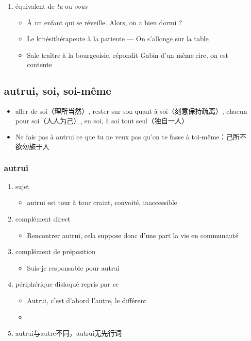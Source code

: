\documentclass[UTF8]{report}
\begin{document}
\begin{enumerate}
\begin{enumerate}
\begin{enumerate}
    \end{enumerate}
    \item équivalent de \textit{tu} ou \textit{vous}
    \begin{itemize}
        \item À un enfant qui se réveille. Alors, on a bien dormi ?
        \item Le kinésithérapeute à la patiente — On s’allonge sur la table
        \item Sale traître à la bourgeoisie, répondit Gabin d’un même rire, on est contente
    \end{itemize}
\end{enumerate}
\end{enumerate}

\subsection{autrui, soi, soi-même}
\begin{itemize}
    \item aller de soi（理所当然）, rester sur son quant-à-soi（刻意保持疏离）, chacun pour soi（人人为己）, en soi, à soi tout seul（独自一人）
    \item Ne fais pas à autrui ce que tu ne veux pas qu’on te fasse à toi-même：己所不欲勿施于人
\end{itemize}
\subsubsection{autrui}
\begin{enumerate}
    \item sujet
    \begin{itemize}
        \item autrui est tour à tour craint, convoité, inaccessible
    \end{itemize}
    \item complément direct
    \begin{itemize}
        \item Rencontrer autrui, cela suppose donc d’une part la vie en communauté
    \end{itemize}
    \item complément de préposition
    \begin{itemize}
        \item Suis-je responsable pour autrui
    \end{itemize}
    \item périphérique disloqué repris par \textit{ce}
    \begin{itemize}
        \item Autrui, c’est d’abord l’autre, le différent
        \item 
    \end{itemize}
    \item autrui与autre不同，autrui无先行词
\end{enumerate}
\end{document}
